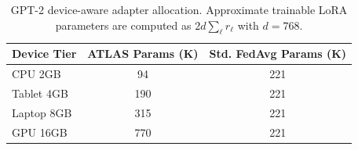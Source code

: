 \begin{table}[t]
\centering
\caption{GPT-2 device-aware adapter allocation. Approximate trainable LoRA parameters are computed as $2d\sum_\ell r_\ell$ with $d=768$.}
\label{tab:device_allocation}
\begin{tabular}{lcc}
\toprule
\textbf{Device Tier} & \textbf{ATLAS Params (K)} & \textbf{Std. FedAvg Params (K)} \\
\midrule
CPU 2GB & 94 & 221 \\
Tablet 4GB & 190 & 221 \\
Laptop 8GB & 315 & 221 \\
GPU 16GB & 770 & 221 \\
\bottomrule
\end{tabular}
\end{table}
